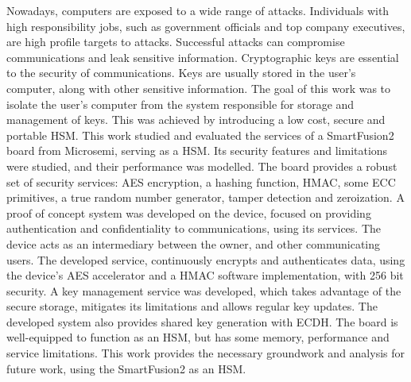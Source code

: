 \noindent Nowadays, computers are exposed to a wide range of attacks. Individuals with high responsibility jobs, such as government officials and top company executives, are high profile targets to attacks. Successful attacks can compromise communications and leak sensitive information. Cryptographic keys are essential to the security of communications. Keys are usually stored in the user's computer, along with other sensitive information. The goal of this work was to isolate the user's computer from the system responsible for storage and management of keys. This was achieved by introducing a low cost, secure and portable \ac{HSM}. This work studied and evaluated the services of a SmartFusion2 board from Microsemi, serving as a HSM. Its security features and limitations were studied, and their performance was modelled. The board provides a robust set of security services: AES encryption, a hashing function, HMAC, some ECC primitives, a true random number generator, tamper detection and zeroization. A proof of concept system was developed on the device, focused on providing authentication and confidentiality to communications, using its services. The device acts as an intermediary between the owner, and other communicating users. The developed service, continuously encrypts and authenticates data, using the device's AES accelerator and a HMAC software implementation, with 256 bit security. A key management service was developed, which takes advantage of the secure storage, mitigates its limitations and allows regular key updates. The developed system also provides shared key generation with ECDH. The board is well-equipped to function as an HSM, but has some memory, performance and service limitations. This work provides the necessary groundwork and analysis for future work, using the SmartFusion2 as an HSM.
